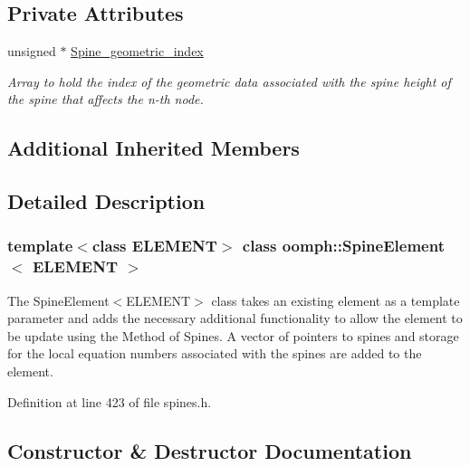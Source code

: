 \subsection*{Private Attributes}
\begin{DoxyCompactItemize}
\item 
unsigned $\ast$ \hyperlink{classoomph_1_1SpineElement_a222c05c78bc15766a81a8a05c811fcf6}{Spine\+\_\+geometric\+\_\+index}
\begin{DoxyCompactList}\small\item\em Array to hold the index of the geometric data associated with the spine height of the spine that affects the n-\/th node. \end{DoxyCompactList}\end{DoxyCompactItemize}
\subsection*{Additional Inherited Members}


\subsection{Detailed Description}
\subsubsection*{template$<$class E\+L\+E\+M\+E\+NT$>$\newline
class oomph\+::\+Spine\+Element$<$ E\+L\+E\+M\+E\+N\+T $>$}

The Spine\+Element$<$\+E\+L\+E\+M\+E\+N\+T$>$ class takes an existing element as a template parameter and adds the necessary additional functionality to allow the element to be update using the Method of Spines. A vector of pointers to spines and storage for the local equation numbers associated with the spines are added to the element. 

Definition at line 423 of file spines.\+h.



\subsection{Constructor \& Destructor Documentation}
\mbox{\label{classoomph_1_1SpineElement_ab8d0c3d5ff2a820c76a9eaef12d1b71c}} 
